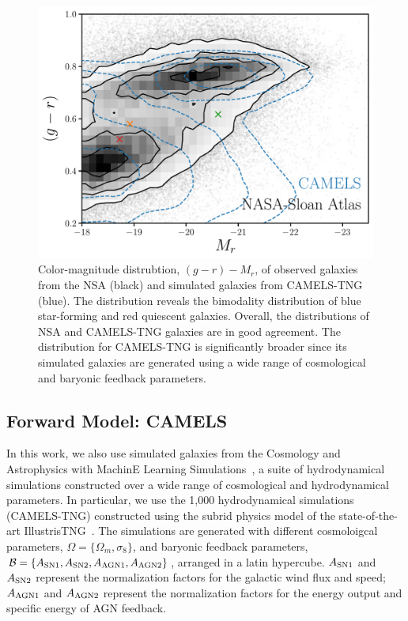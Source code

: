 \begin{figure}[ht]
\vskip 0.2in
\begin{center}
    \centerline{\includegraphics[width=\columnwidth]{figs/nsa.pdf}}
    \caption{Color-magnitude distrubtion, $(g-r) - M_r$, of observed galaxies
    from the NSA (black) and simulated galaxies from CAMELS-TNG (blue). 
    The distribution reveals the bimodality distribution of blue star-forming
    and red quiescent galaxies. 
    Overall, the distributions of NSA and CAMELS-TNG galaxies are in good
    agreement. 
    The distribution for CAMELS-TNG is significantly broader since its simulated
    galaxies are generated using a wide range of cosmological and baryonic
    feedback parameters.
    }\label{fig:nsa}
\end{center}
\vskip -0.2in
\end{figure}

\subsection{Forward Model: CAMELS} \label{sec:sims} 
In this work, we also use simulated galaxies from the Cosmology and
Astrophysics with MachinE Learning
Simulations~\citep[CAMELS;]{villaescusa-navarro2021, villaescusa-navarro2022a},
a suite of hydrodynamical simulations constructed over a wide
range of cosmological and hydrodynamical parameters.
In particular, we use the 1,000 hydrodynamical simulations (CAMELS-TNG)
constructed using the subrid physics model of the state-of-the-art
IllustrisTNG~\citep{nelson2019}. 
The simulations are generated with different cosmoloigcal parameters,
$\Omega = \{\Omega_m, \sigma_8\}$, and baryonic feedback parameters, 
$\mathcal{B} = \{A_{\rm SN1}, A_{\rm SN2}, A_{\rm AGN1}, A_{\rm AGN2}\}$,
arranged in a latin hypercube. 
$A_{\rm SN1}$ and $A_{\rm SN2}$ represent the normalization factors for the 
galactic wind flux and speed; 
$A_{\rm AGN1}$ and $A_{\rm AGN2}$ represent the normalization factors for the 
energy output and specific energy of AGN feedback.

